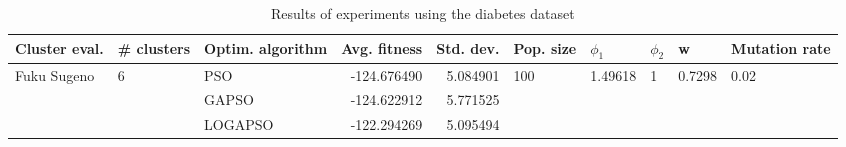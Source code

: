 \begin{table}
\centering
\caption{Results of experiments using the diabetes dataset}
\begin{tabular}{lllrrlllll}
\toprule
               Cluster eval. &        \# clusters & Optim. algorithm &  Avg. fitness &  Std. dev. &            Pop. size &               $\phi_{1}$ &         $\phi_{2}$ &                       w &         Mutation rate \\
\midrule
\multirow{3}{*}{Fuku Sugeno} & \multirow{3}{*}{6} &              PSO &   -124.676490 &   5.084901 & \multirow{3}{*}{100} & \multirow{3}{*}{1.49618} & \multirow{3}{*}{1} & \multirow{3}{*}{0.7298} & \multirow{3}{*}{0.02} \\
                             &                    &            GAPSO &   -124.622912 &   5.771525 &                      &                          &                    &                         &                       \\
                             &                    &          LOGAPSO &   -122.294269 &   5.095494 &                      &                          &                    &                         &                       \\
\bottomrule
\end{tabular}
\end{table}
